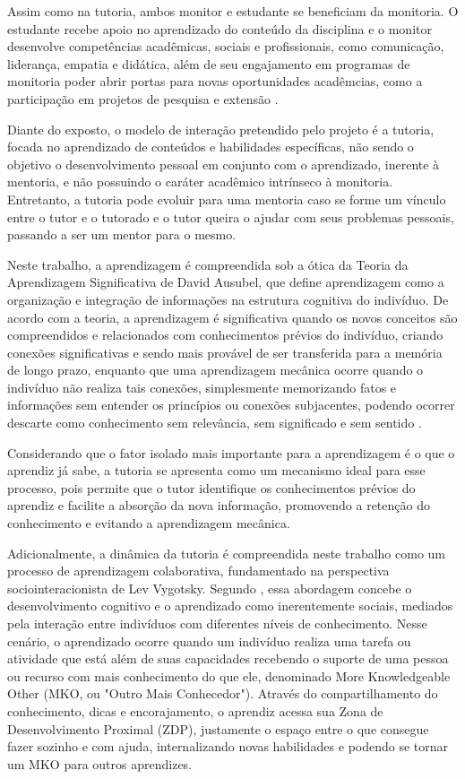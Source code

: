 Assim como na tutoria, ambos monitor e estudante se beneficiam da monitoria. O estudante recebe apoio no aprendizado do conteúdo da disciplina e o monitor desenvolve competências acadêmicas, sociais e profissionais, como comunicação, liderança, empatia e didática, além de seu engajamento em programas de monitoria poder abrir portas para novas oportunidades acadêmcias, como a participação em projetos de pesquisa e extensão \cite{monitoria2025}.

Diante do exposto, o modelo de interação pretendido pelo projeto é a tutoria, focada no aprendizado de conteúdos e habilidades específicas, não sendo o objetivo o desenvolvimento pessoal em conjunto com o aprendizado, inerente à mentoria, e não possuindo o caráter acadêmico intrínseco à monitoria. Entretanto, a tutoria pode evoluir para uma mentoria caso se forme um vínculo entre o tutor e o tutorado e o tutor queira o ajudar com seus problemas pessoais, passando a ser um mentor para o mesmo.

Neste trabalho, a aprendizagem é compreendida sob a ótica da Teoria da Aprendizagem Significativa de David Ausubel, que define aprendizagem como a organização e
integração de informações na estrutura cognitiva do indivíduo. De acordo com a teoria, a aprendizagem é significativa quando os novos conceitos são compreendidos e relacionados com conhecimentos prévios do indivíduo, criando conexões significativas e sendo mais provável de ser transferida para a memória de longo prazo, enquanto que uma aprendizagem mecânica ocorre quando o indivíduo não realiza tais conexões, simplesmente memorizando fatos e informações sem entender os princípios ou conexões subjacentes, podendo ocorrer descarte como conhecimento sem relevância, sem significado e sem sentido \cite{junior2023olhar}.

Considerando que o fator isolado mais importante para a aprendizagem é o que o aprendiz já sabe, a tutoria se apresenta como um mecanismo ideal para esse processo, pois permite que o tutor identifique os conhecimentos prévios do aprendiz e facilite a absorção da nova informação, promovendo a retenção do conhecimento e evitando a aprendizagem mecânica.

Adicionalmente, a dinâmica da tutoria é compreendida neste trabalho como um processo de aprendizagem colaborativa, fundamentado na perspectiva sociointeracionista de Lev Vygotsky. Segundo , essa abordagem concebe o desenvolvimento cognitivo e o aprendizado como inerentemente sociais, mediados pela interação entre indivíduos com diferentes níveis de conhecimento. Nesse cenário, o aprendizado ocorre quando um indivíduo realiza uma tarefa ou atividade que está além de suas capacidades recebendo o suporte de uma pessoa ou recurso com mais conhecimento do que ele, denominado More Knowledgeable Other (MKO, ou "Outro Mais Conhecedor"). Através do compartilhamento do conhecimento, dicas e encorajamento, o aprendiz acessa sua Zona de Desenvolvimento Proximal (ZDP), justamente o espaço entre o que consegue fazer sozinho e com ajuda, internalizando novas habilidades e podendo se tornar um MKO para outros aprendizes.  

